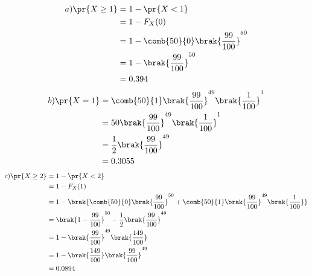 \documentclass[journal,12pt,twocolumn]{IEEEtran}
\theoremstyle{remark}
\begin{document}
  \begin{align}
a)  \pr{X \geq 1} &= 1 - \pr{X < 1} \\
  &= 1 - F_X(0)  \\
  &= 1 - \comb{50}{0}\brak{\frac{99}{100}}^{50} \\
  &= 1 - \brak{\frac{99}{100}}^{50} \\
  &= 0.394
 \end{align}
 \begin{align}
b)  \pr{X=1} &= \comb{50}{1}\brak{\frac{99}{100}}^{49}\brak{\frac{1}{100}}^{1} \\
  &= 50\brak{\frac{99}{100}}^{49}\brak{\frac{1}{100}}^{1} \\
  &= \frac{1}{2}\brak{\frac{99}{100}}^{49} \\
  &= 0.3055
\end{align} 
\begin{align}
c)  \pr{X \geq 2}  &= 1 - \pr{X<2}\\  
   &= 1 - F_X(1) \\
   &= 1 -  \brak{\comb{50}{0}\brak{\frac{99}{100}}^{50}+ \comb{50}{1}\brak{\frac{99}{100}}^{49}\brak{\frac{1}{100}}} \\
   &= \brak{1 - \frac{99}{100}}^{50} - \frac{1}{2}\brak{\frac{99}{100}}^{49} \\
   &= 1 - \brak{\frac{99}{100}}^{49}\brak{\frac{149}{100}} \\
   &= 1 - \brak{\frac{149}{100}}\brak{\frac{99}{100}}^{49} \\
   &= 0.0894
\end{align}
\end{document}
